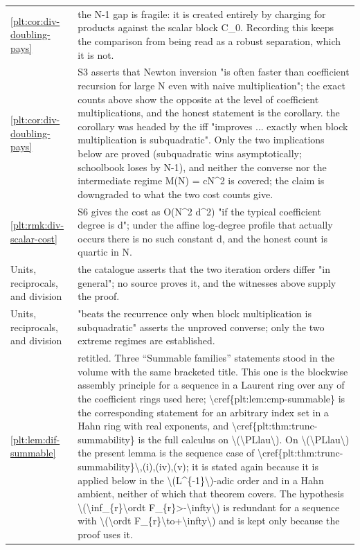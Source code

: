 \documentclass[11pt,oneside]{article}
\theoremstyle{plain}
\theoremstyle{definition}
\theoremstyle{remark}
\begin{document}
\begin{longtable}{@{}p{} p{}@{}}
\cref{plt:cor:div-doubling-pays} & the N-1 gap is fragile: it is created entirely by charging for products against the scalar block C\_0. Recording this keeps the comparison from being read as a robust separation, which it is not.\\
\cref{plt:cor:div-doubling-pays} & S3 asserts that Newton inversion "is often faster than coefficient recursion for large N even with naive multiplication"; the exact counts above show the opposite at the level of coefficient multiplications, and the honest statement is the corollary. the corollary was headed by the iff "improves ... exactly when block multiplication is subquadratic". Only the two implications below are proved (subquadratic wins asymptotically; schoolbook loses by N-1), and neither the converse nor the intermediate regime M(N) = cN\textasciicircum 2 is covered; the claim is downgraded to what the two cost counts give.\\
\cref{plt:rmk:div-scalar-cost} & S6 gives the cost as O(N\textasciicircum 2 d\textasciicircum 2) "if the typical coefficient degree is d"; under the affine log-degree profile that actually occurs there is no such constant d, and the honest count is quartic in N.\\
Units, reciprocals, and division & the catalogue asserts that the two iteration orders differ "in general"; no source proves it, and the witnesses above supply the proof.\\
Units, reciprocals, and division & "beats the recurrence only when block multiplication is subquadratic" asserts the unproved converse; only the two extreme regimes are established.\\
\cref{plt:lem:dif-summable} & retitled. Three ``Summable families'' statements stood in the volume with the same bracketed title. This one is the blockwise assembly principle for a sequence in a Laurent ring over any of the coefficient rings used here; \textbackslash cref\{plt:lem:cmp-summable\} is the corresponding statement for an arbitrary index set in a Hahn ring with real exponents, and \textbackslash cref\{plt:thm:trunc-summability\} is the full calculus on \textbackslash (\textbackslash PLlau\textbackslash ). On \textbackslash (\textbackslash PLlau\textbackslash ) the present lemma is the sequence case of \textbackslash cref\{plt:thm:trunc-summability\}\textbackslash ,(i),(iv),(v); it is stated again because it is applied below in the \textbackslash (L\textasciicircum \{-1\}\textbackslash )-adic order and in a Hahn ambient, neither of which that theorem covers. The hypothesis \textbackslash (\textbackslash inf\_\{r\}\textbackslash ordt F\_\{r\}>-\textbackslash infty\textbackslash ) is redundant for a sequence with \textbackslash (\textbackslash ordt F\_\{r\}\textbackslash to+\textbackslash infty\textbackslash ) and is kept only because the proof uses it.\\

\end{longtable}
\end{document}
